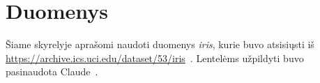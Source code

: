 \section{Duomenys}
\label{sec:Duomenys}

Šiame skyrelyje aprašomi naudoti duomenys \textit{iris}, kurie buvo atsisiųsti iš \url{https://archive.ics.uci.edu/dataset/53/iris}~\cite{iris_53}.
Lentelėms užpildyti buvo pasinaudota Claude~\cite{claude_bendrai}.


